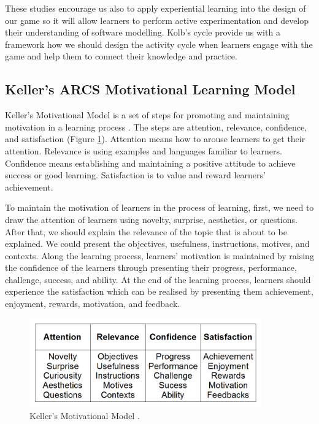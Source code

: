 \documentclass[12pt, a4paper]{report}
\begin{document}
These studies encourage us also to apply experiential learning into the design of our game so it will allow learners to perform active experimentation and develop their understanding of software modelling. Kolb's cycle provide us with a framework how we should design the activity cycle when learners engage with the game and help them to connect their knowledge and practice. 
 
\subsection{Keller's ARCS Motivational Learning Model}
Keller's Motivational Model is a set of steps for promoting and maintaining motivation in a learning process \cite{keller2010motivational}. The steps are attention, relevance, confidence, and satisfaction (Figure \ref{keller}). Attention means how to arouse learners to get their attention. Relevance is using examples and languages familiar to learners. Confidence means establishing and maintaining a positive attitude to achieve success or good learning. Satisfaction is to value and reward learners' achievement. 

To maintain the motivation of learners in the process of learning, first, we need to draw the attention of learners using novelty, surprise, aesthetics, or questions. After that, we should explain the relevance of the topic that is about to be explained. We could present the objectives, usefulness, instructions, motives, and contexts. Along the learning process, learners' motivation is maintained by raising the confidence of the learners through presenting their progress, performance, challenge, success, and ability. At the end of the learning process, learners should experience the satisfaction which can be realised by presenting them achievement, enjoyment, rewards, motivation, and feedback.

\begin{figure}[ht]
\centering
\includegraphics[width=10cm]{keller}
\caption{Keller's Motivational Model \cite{keller2010motivational}.}
\label{keller}
\end{figure}
\end{document}
